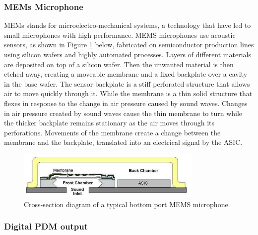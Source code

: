 \subsubsection{MEMs Microphone}
MEMs \cite{MEMs} stands for microelectro-mechanical systems, a technology that have led to small microphones with high performance. MEMS microphones use acoustic sensors, as shown in Figure \ref{fig:MEMS} below, fabricated on semiconductor production lines using silicon wafers and highly automated processes. Layers of different materials are deposited on top of a silicon wafer. Then the unwanted material is then etched away, creating a moveable membrane and a fixed backplate over a cavity in the base wafer. The sensor backplate is a stiff perforated structure that allows air to move quickly through it. While the membrane is a thin solid structure that flexes in response to the change in air pressure caused by sound waves. Changes in air pressure created by sound waves cause the thin membrane to turn while the thicker backplate remains stationary as the air moves through its perforations. Movements of the membrane create a change between the membrane and the backplate, translated into an electrical signal by the ASIC.

\begin{figure}[H]
	\centering
	\noindent\includegraphics[width=0.8\textwidth]{images/MEMS.png}
	\caption{Cross-section diagram of a typical bottom port MEMS microphone }
	\label{fig:MEMS}
\end{figure}

\subsubsection{Digital PDM output}

